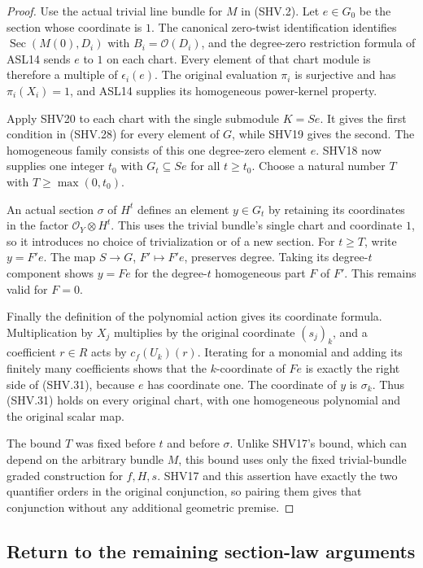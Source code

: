 \documentclass[11pt,a4paper]{article}
\numberwithin{equation}{section}
\theoremstyle{remark}\newtheorem{remark}[theorem]{Remark}
\begin{document}
\begin{proof}
Use the actual trivial line bundle for $M$ in (SHV.2).
Let $e\in G_0$ be the section whose coordinate is $1$.
The canonical zero-twist identification identifies
$\operatorname{Sec}(M(0),D_i)$ with $B_i=\mathcal O(D_i)$,
and the degree-zero restriction formula of ASL14 sends
$e$ to $1$ on each chart.  Every element of that chart
module is therefore a multiple of $\epsilon_i(e)$.
The original evaluation $\pi_i$ is surjective and has
$\pi_i(X_i)=1$, and ASL14 supplies its homogeneous
power-kernel property.

Apply SHV20 to each chart with the single submodule $K=S e$.
It gives the first condition in (SHV.28) for every element
of $G$, while SHV19 gives the second.  The homogeneous
family consists of this one degree-zero element $e$.
SHV18 now supplies one integer $t_0$ with $G_t\subseteq S e$
for all $t\ge t_0$.  Choose a natural number $T$ with
$T\ge\max(0,t_0)$.

An actual section $\sigma$ of $H^t$ defines an element
$y\in G_t$ by retaining its coordinates in the factor
$\mathcal O_Y\otimes H^t$.  This uses the trivial bundle's
single chart and coordinate $1$, so it introduces no choice
of trivialization or of a new section.
For $t\ge T$, write $y=F'e$.
The map $S\to G$, $F'\mapsto F'e$, preserves degree.
Taking its degree-$t$ component shows
$y=F e$ for the degree-$t$ homogeneous part $F$ of $F'$.
This remains valid for $F=0$.

Finally the definition of the polynomial action gives its
coordinate formula.  Multiplication by $X_j$ multiplies by
the original coordinate $(s_j)_k$, and a coefficient $r\in R$
acts by $c_f(U_k)(r)$.  Iterating for a monomial and adding
its finitely many coefficients shows that the $k$-coordinate
of $F e$ is exactly the right side of (SHV.31), because
$e$ has coordinate one.  The coordinate of $y$ is $\sigma_k$.
Thus (SHV.31) holds on every original chart, with one
homogeneous polynomial and the original scalar map.

The bound $T$ was fixed before $t$ and before $\sigma$.
Unlike SHV17's bound, which can depend on the arbitrary
bundle $M$, this bound uses only the fixed trivial-bundle
graded construction for $f,H,s$.
SHV17 and this assertion have exactly the two quantifier
orders in the original conjunction, so pairing them gives
that conjunction without any additional geometric premise.
\end{proof}

\subsection{Return to the remaining section-law arguments}
\end{document}
